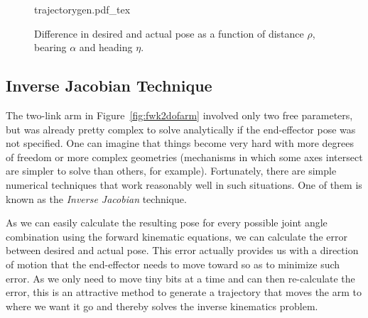 \begin{figure}
    \centering
    \def\svgwidth{\textwidth}
    {trajectorygen.pdf_tex}
    \caption{Difference in desired and actual pose as a function of distance $\rho$, bearing $\alpha$ and heading $\eta$.}
    \label{fig:trajectorygen}
\end{figure}


\subsection{Inverse Jacobian Technique}\label{sec:kinematics:ik:invjac}

The two-link arm in Figure~\ref{fig:fwk2dofarm} involved only two free parameters, but was already pretty complex to solve analytically if the end-effector pose was not specified.
One can imagine that things become very hard with more degrees of freedom or more complex geometries (mechanisms in which some axes intersect are simpler to solve than others, for example).
Fortunately, there are simple numerical techniques that work reasonably well in such situations.
One of them is known as the \emph{Inverse Jacobian} technique.

As we can easily calculate the resulting pose for every possible joint angle combination using the forward kinematic equations, we can calculate the error between desired and actual pose.
This error actually provides us with a direction of motion that the end-effector needs to move toward so as to minimize such error.
As we only need to move tiny bits at a time and can then re-calculate the error, this is an attractive method to generate a trajectory that moves the arm to where we want it go and thereby solves the inverse kinematics problem.

